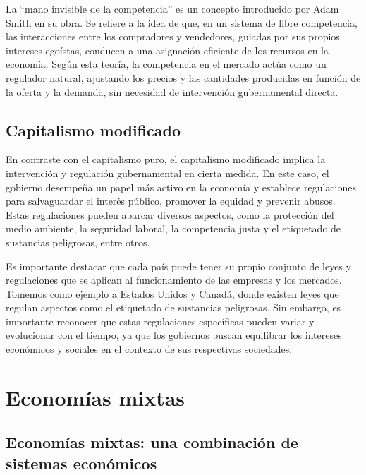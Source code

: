 \documentclass[
  letterpaper,
  DIV=11,
  numbers=noendperiod]{scrartcl}
\begin{document}
La ``mano invisible de la competencia'' es un concepto introducido por
Adam Smith en su obra. Se refiere a la idea de que, en un sistema de
libre competencia, las interacciones entre los compradores y vendedores,
guiadas por sus propios intereses egoístas, conducen a una asignación
eficiente de los recursos en la economía. Según esta teoría, la
competencia en el mercado actúa como un regulador natural, ajustando los
precios y las cantidades producidas en función de la oferta y la
demanda, sin necesidad de intervención gubernamental directa.

\hypertarget{capitalismo-modificado}{%
\subsection{Capitalismo modificado}\label{capitalismo-modificado}}

En contraste con el capitalismo puro, el capitalismo modificado implica
la intervención y regulación gubernamental en cierta medida. En este
caso, el gobierno desempeña un papel más activo en la economía y
establece regulaciones para salvaguardar el interés público, promover la
equidad y prevenir abusos. Estas regulaciones pueden abarcar diversos
aspectos, como la protección del medio ambiente, la seguridad laboral,
la competencia justa y el etiquetado de sustancias peligrosas, entre
otros.

Es importante destacar que cada país puede tener su propio conjunto de
leyes y regulaciones que se aplican al funcionamiento de las empresas y
los mercados. Tomemos como ejemplo a Estados Unidos y Canadá, donde
existen leyes que regulan aspectos como el etiquetado de sustancias
peligrosas. Sin embargo, es importante reconocer que estas regulaciones
específicas pueden variar y evolucionar con el tiempo, ya que los
gobiernos buscan equilibrar los intereses económicos y sociales en el
contexto de sus respectivas sociedades.

\hypertarget{economuxedas-mixtas}{%
\section{Economías mixtas}\label{economuxedas-mixtas}}

\hypertarget{economuxedas-mixtas-una-combinaciuxf3n-de-sistemas-econuxf3micos}{%
\subsection{Economías mixtas: una combinación de sistemas
económicos}\label{economuxedas-mixtas-una-combinaciuxf3n-de-sistemas-econuxf3micos}}
\end{document}
